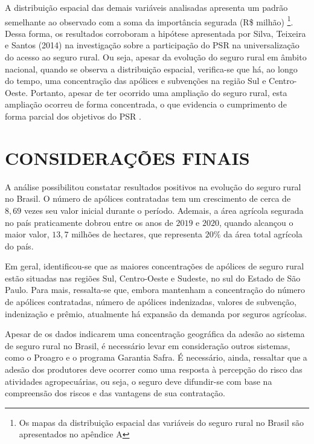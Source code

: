 A distribuição espacial das demais variáveis analisadas apresenta um padrão semelhante ao observado com a soma da importância segurada (R\$ milhão)  \footnote{Os mapas da distribuição espacial das variáveis do seguro rural no Brasil são apresentados no apêndice A}. Dessa forma, os resultados corroboram a hipótese apresentada por Silva, Teixeira e Santos (2014) na investigação sobre a participação do PSR na universalização do acesso ao seguro rural. Ou seja, apesar da evolução do seguro rural em âmbito nacional, quando se observa a distribuição espacial, verifica-se que há, ao longo do tempo, uma concentração das apólices e subvenções na região Sul e Centro-Oeste. Portanto, apesar de ter ocorrido uma ampliação do seguro rural, esta ampliação ocorreu de forma concentrada, o que evidencia o cumprimento de forma parcial dos objetivos do PSR \cite{silva14}.

\section{CONSIDERAÇÕES FINAIS}


A análise possibilitou constatar resultados positivos na evolução do seguro rural no Brasil. O número de apólices contratadas tem um crescimento de cerca de $8,69$ vezes seu valor inicial durante o período. Ademais, a área agrícola segurada no país praticamente dobrou entre os anos de $2019$ e $2020$, quando alcançou o maior valor, $13,7$ milhões de hectares, que representa $20\%$ da área total agrícola do país. 

Em geral, identificou-se que as maiores concentrações de apólices de seguro rural estão situadas nas regiões Sul, Centro-Oeste e Sudeste, no sul do Estado de São Paulo.  Para mais, ressalta-se que, embora mantenham a concentração do número de apólices contratadas, número de apólices indenizadas, valores de subvenção, indenização e prêmio, atualmente há expansão da demanda por seguros agrícolas. 

Apesar de os dados indicarem uma concentração geográfica da adesão ao sistema de seguro rural no Brasil, é necessário levar em consideração outros sistemas, como o Proagro e o programa Garantia Safra. É necessário, ainda, ressaltar que a adesão dos produtores deve ocorrer como uma resposta à percepção do risco das atividades agropecuárias, ou seja, o seguro deve difundir-se com base na compreensão dos riscos e das vantagens de sua contratação. 

